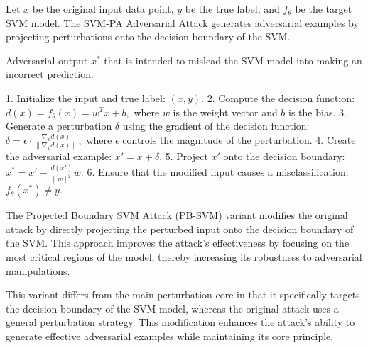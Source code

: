 Let \( x \) be the original input data point, \( y \) be the true label, and \( f_{\theta} \) be the target SVM model. The SVM-PA Adversarial Attack generates adversarial examples by projecting perturbations onto the decision boundary of the SVM.

Adversarial output \( x^* \) that is intended to mislead the SVM model into making an incorrect prediction.

1. Initialize the input and true label:
   $
   (x, y).
   $
2. Compute the decision function:
   $
   d(x) = f_{\theta}(x) = w^T x + b,
   $
   where \( w \) is the weight vector and \( b \) is the bias.
3. Generate a perturbation \( \delta \) using the gradient of the decision function:
   $
   \delta = \epsilon \cdot \frac{\nabla_x d(x)}{\|\nabla_x d(x)\|},
   $
   where \( \epsilon \) controls the magnitude of the perturbation.
4. Create the adversarial example:
   $
   x' = x + \delta.
   $
5. Project \( x' \) onto the decision boundary:
   $
   x^* = x' - \frac{d(x')}{\|w\|^2} w.
   $
6. Ensure that the modified input causes a misclassification:
   $
   f_{\theta}(x^*) \neq y.
   $

The Projected Boundary SVM Attack (PB-SVM) variant modifies the original attack by directly projecting the perturbed input onto the decision boundary of the SVM. This approach improves the attack's effectiveness by focusing on the most critical regions of the model, thereby increasing its robustness to adversarial manipulations.

This variant differs from the main perturbation core in that it specifically targets the decision boundary of the SVM model, whereas the original attack uses a general perturbation strategy. This modification enhances the attack's ability to generate effective adversarial examples while maintaining its core principle.